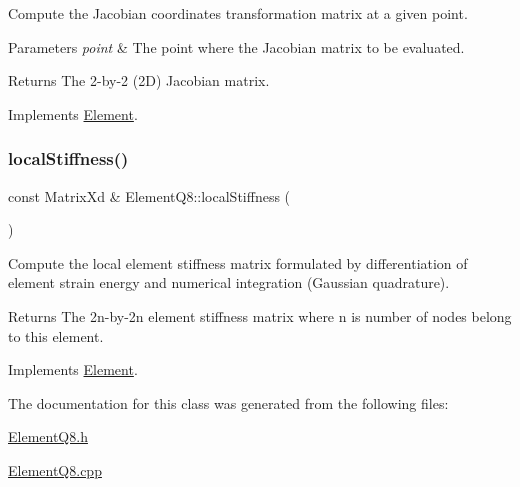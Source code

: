 Compute the Jacobian coordinates transformation matrix at a given point. 


\begin{DoxyParams}{Parameters}
{\em point} & The point where the Jacobian matrix to be evaluated. \\
\hline
\end{DoxyParams}
\begin{DoxyReturn}{Returns}
The 2-\/by-\/2 (2D) Jacobian matrix. 
\end{DoxyReturn}


Implements \mbox{\hyperlink{class_element_ad469c745f0bcb9d7a3431b1608c1ade6}{Element}}.

\mbox{\label{class_element_q8_afc898e404f9abb5a5a4d74eee54476b7}} 
\subsubsection{\texorpdfstring{local\+Stiffness()}{localStiffness()}}
{\footnotesize\ttfamily const Matrix\+Xd \& Element\+Q8\+::local\+Stiffness (\begin{DoxyParamCaption}{ }\end{DoxyParamCaption})\hspace{0.3cm}{\ttfamily [virtual]}}



Compute the local element stiffness matrix formulated by differentiation of element strain energy and numerical integration (Gaussian quadrature). 

\begin{DoxyReturn}{Returns}
The 2n-\/by-\/2n element stiffness matrix where n is number of nodes belong to this element. 
\end{DoxyReturn}


Implements \mbox{\hyperlink{class_element_a603fbe060b5d6979506f0d2130e6c171}{Element}}.



The documentation for this class was generated from the following files\+:\begin{DoxyCompactItemize}
\item 
\mbox{\hyperlink{_element_q8_8h}{Element\+Q8.\+h}}\item 
\mbox{\hyperlink{_element_q8_8cpp}{Element\+Q8.\+cpp}}\end{DoxyCompactItemize}
